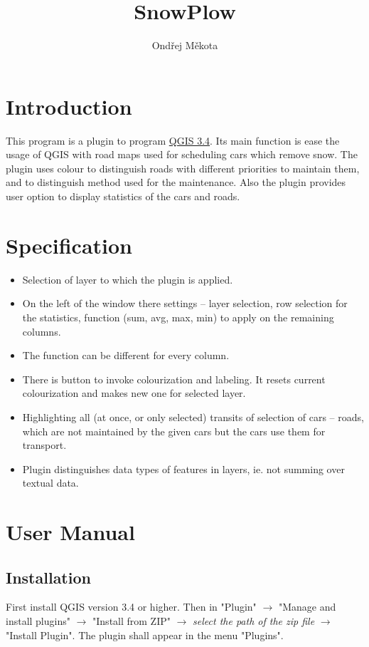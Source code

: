 \documentclass[12pt,a4paper]{article}
\begin{document}
\title{SnowPlow}
\author{Ondřej Měkota}

\maketitle
\pagebreak
\tableofcontents
\pagebreak
\section{Introduction}

\par This program is a plugin to program \href{https://qgis.org/en/site/index.html}{QGIS 3.4}. 
Its main function is ease the usage of QGIS with road maps used for scheduling cars which remove snow.
The plugin uses colour to distinguish roads with different priorities to maintain them, and to distinguish method used for the maintenance. 
Also the plugin provides user option to display statistics of the cars and roads.

\section{Specification}
\begin{itemize}
    \item Selection of layer to which the plugin is applied.
    \item On the left of the window there settings – layer selection, row selection for the statistics, function (sum, avg, max, min) to apply on the remaining columns.
    \item The function can be different for every column.
    \item There is button to invoke colourization and labeling. It resets current colourization and makes new one for selected layer.
    \item Highlighting all (at once, or only selected) transits of selection of cars – roads, which are not maintained by the given cars but the cars use them for transport. 
    \item Plugin distinguishes data types of features in layers, ie. not summing over textual data. 
\end{itemize}

\pagebreak
\section{User Manual}
\subsection{Installation}
First install QGIS version 3.4 or higher. 
Then in "Plugin" $\rightarrow$ "Manage and install plugins" $\rightarrow$ "Install from ZIP" $\rightarrow$ \emph{select the path of the zip file} $\rightarrow$ "Install Plugin".
The plugin shall appear in the menu "Plugins".
\end{document}
